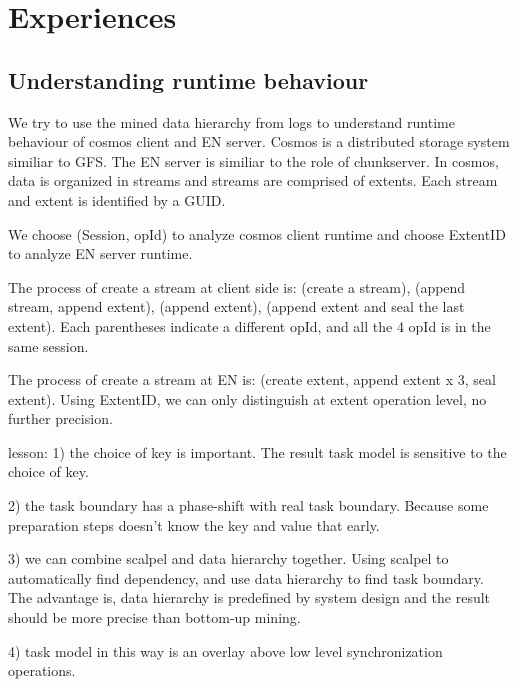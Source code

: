 
\section{Experiences}
\label{sec:exp}


\subsection{Understanding runtime behaviour}

We try to use the mined data hierarchy from logs to
understand runtime behaviour of cosmos client and EN server.
Cosmos is a distributed storage system similiar to GFS. The
EN server is similiar to the role of chunkserver. In cosmos,
data is organized in streams and streams are comprised of
extents. Each stream and extent is identified by a GUID.

We choose (Session, opId) to analyze cosmos client runtime
and choose ExtentID to analyze EN server runtime.

The process of create a stream at client side is: (create a
stream), (append stream, append extent), (append extent),
(append extent and seal the last extent). Each parentheses
indicate a different opId, and all the 4 opId is in the same
session.

The process of create a stream at EN is: (create extent,
append extent x 3, seal extent). Using ExtentID, we can only
distinguish at extent operation level, no further precision.

lesson:
1) the choice of key is important. The result task model is
sensitive to the choice of key.

2) the task boundary has a phase-shift with real task
boundary. Because some preparation steps doesn't know the
key and value that early.

3) we can combine scalpel and data hierarchy together. Using
scalpel to automatically find dependency, and use data
hierarchy to find task boundary. The advantage is, data
hierarchy is predefined by system design and the result
should be more precise than bottom-up mining.

4) task model in this way is an overlay above low level
synchronization operations.

